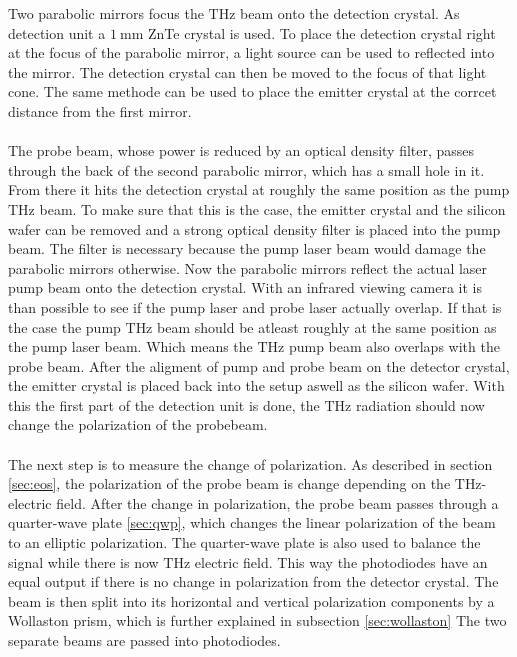 Two parabolic mirrors focus the $\si{\tera\hertz}$ beam onto the detection crystal.
As detection unit a $\SI{1}{\milli\meter}$ ZnTe crystal is used.
To place the detection crystal right at the focus of the parabolic mirror, a light source can be used to reflected into the mirror.
The detection crystal can then be moved to the focus of that light cone.
The same methode can be used to place the emitter crystal at the corrcet distance from the first mirror.
\\\\
The probe beam, whose power is reduced by an optical density filter, passes through the back of the second parabolic mirror, which has a small hole in it.
From there it hits the detection crystal at roughly the same position as the pump $\si{\tera\hertz}$ beam.
To make sure that this is the case, the emitter crystal and the silicon wafer can be removed and a strong optical density filter is placed into the pump beam.
The filter is necessary because the pump laser beam would damage the parabolic mirrors otherwise.
Now the parabolic mirrors reflect the actual laser pump beam onto the detection crystal.
With an infrared viewing camera it is than possible to see if the pump laser and probe laser actually overlap.
If that is the case the pump $\si{\tera\hertz}$ beam should be atleast roughly at the same position as the pump laser beam.
Which means the $\si{\tera\hertz}$ pump beam also overlaps with the probe beam.
After the aligment of pump and probe beam on the detector crystal, the emitter crystal is placed back into the setup aswell as the silicon wafer.
With this the first part of the detection unit is done, the $\si{\tera\hertz}$ radiation should now change the polarization of the probebeam.
\\\\
The next step is to measure the change of polarization.
As described in section \ref{sec:eos}, the polarization of the probe beam is change depending on the $\si{\tera\hertz}$-electric field.
After the change in polarization, the probe beam passes through a quarter-wave plate \ref{sec:qwp}, which changes the linear polarization of the beam to an elliptic polarization.
The quarter-wave plate is also used to balance the signal while there is now $\si{\tera\hertz}$ electric field.
This way the photodiodes have an equal output if there is no change in polarization from the detector crystal.
The beam is then split into its horizontal and vertical polarization components by a Wollaston prism, which is further explained in subsection \ref{sec:wollaston}
The two separate beams are passed into photodiodes.
